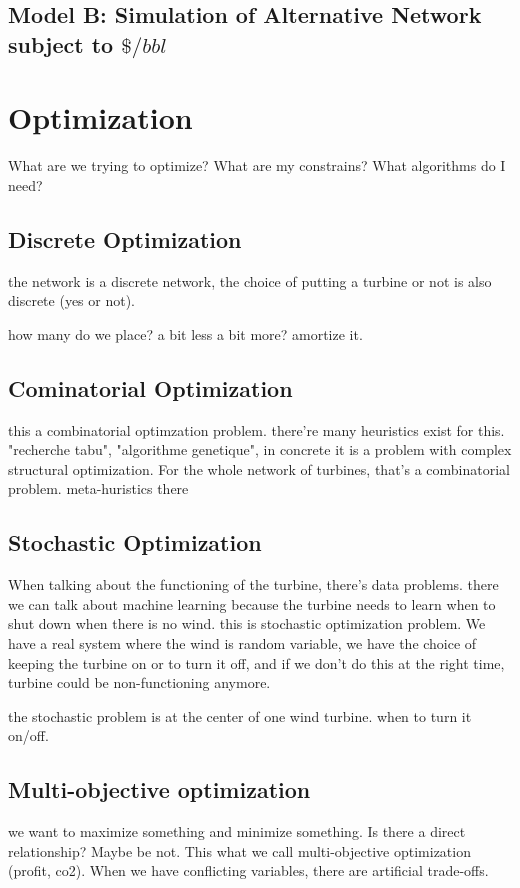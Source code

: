 \documentclass[12pt]{article}
\begin{document}
\subsection{Model B: Simulation of Alternative Network subject to $\$/bbl$}


\section{Optimization}
What are we trying to optimize? What are my constrains? What algorithms do I need?

\subsection{Discrete Optimization}
the network is a discrete network, the choice of putting a turbine or not is also
discrete (yes or not). 

how many do we place? a bit less a bit more? amortize it.

\subsection{Cominatorial Optimization}
this a combinatorial optimzation problem. there're many heuristics exist for this. 
"recherche tabu", "algorithme genetique", in concrete it is a problem with complex
structural optimization. 
For the whole network of turbines, that's a combinatorial problem. meta-huristics there


\subsection{Stochastic Optimization}
When talking about the functioning of the turbine, there's data problems.
there we can talk about machine learning because the turbine needs to learn when to shut down when there is no wind. this is stochastic optimization problem. We have a real 
system where the wind is random variable, we have the choice of keeping the turbine on or to turn it off, and if we don't do this at the right time, turbine could be non-functioning anymore. 

the stochastic problem is at the center of one wind turbine. when to turn it on/off.

\subsection{Multi-objective optimization}
we want to maximize something and minimize something. Is there a direct relationship?
Maybe be not. This what we call multi-objective optimization (profit, co2). When we have conflicting variables, there are artificial trade-offs. 
\end{document}
